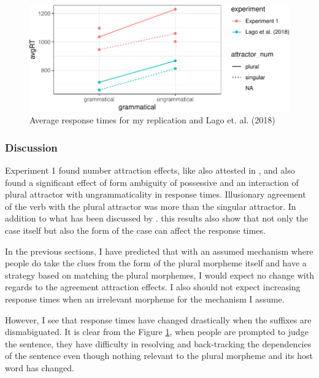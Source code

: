 \documentclass[doc]{apa6}
\begin{document}
\begin{figure}
\centering
\includegraphics{AgreementAttraction_files/figure-latex/exp1AvgRTs-1.pdf}
\caption{\label{fig:exp1AvgRTs}Average response times for my replication and Lago et. al. (2018)}
\end{figure}

\hypertarget{discussion}{%
\subsubsection{Discussion}\label{discussion}}

Experiment 1 found number attraction effects, like also attested in \textcite{Lago2018}, and also found a significant effect of form ambiguity of possessive and an interaction of plural attractor with ungrammaticality in response times. Illusionary agreement of the verb with the plural attractor was more than the singular attractor. In addition to what has been discussed by \textcite{Avetisyan2019}. this results also show that not only the case itself but also the form of the case can affect the response times.

In the previous sections, I have predicted that with an assumed mechanism where people do take the clues from the form of the plural morpheme itself and have a strategy based on matching the plural morphemes, I would expect no change with regards to the agreement attraction effects. I also should not expect increasing response times when an irrelevant morpheme for the mechanism I assume.

However, I see that response times have changed drastically when the suffixes are dismabiguated. It is clear from the Figure \ref{fig:exp1AvgRTs}, when people are prompted to judge the sentence, they have difficulty in resolving and back-tracking the dependencies of the sentence even though nothing relevant to the plural morpheme and its host word has changed.
\end{document}
